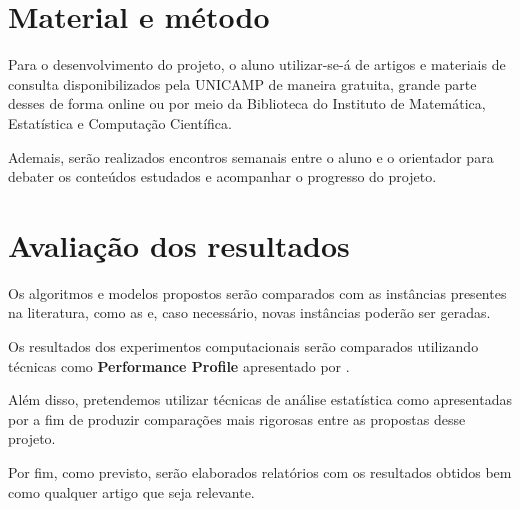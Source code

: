 \documentclass[11pt]{article}
\begin{document}
\section{Material e método}
\label{sec:org7a59e2a}
Para o desenvolvimento do projeto, o aluno utilizar-se-á de artigos e materiais de consulta disponibilizados pela UNICAMP de maneira gratuita, grande parte desses de forma online ou por meio da Biblioteca do Instituto de Matemática, Estatística e Computação Científica.

Ademais, serão realizados encontros semanais entre o aluno e o orientador para debater os conteúdos estudados e acompanhar o progresso do projeto.

\section{Avaliação dos resultados}
\label{sec:org113a097}
Os algoritmos e modelos propostos serão comparados com as instâncias presentes na literatura, como as \textcite{GraphColoringInstances} e, caso necessário, novas instâncias poderão ser geradas.

Os resultados dos experimentos computacionais serão comparados utilizando técnicas como \textbf{Performance Profile} apresentado por \textcite{Dolan2002Benchmarkingoptimizationsoftware}.

Além disso, pretendemos utilizar técnicas de análise estatística como apresentadas por \autocite{Derrac2011practicaltutorialuse} a fim de produzir comparações mais rigorosas entre as propostas desse projeto.

Por fim, como previsto, serão elaborados relatórios com os resultados obtidos bem como qualquer artigo que seja relevante.

\printbibliography
\end{document}
